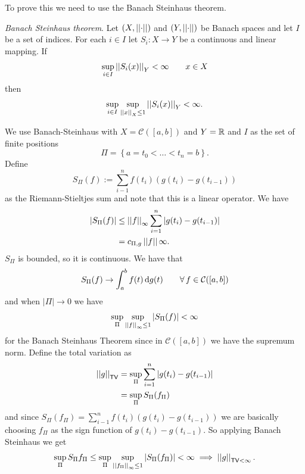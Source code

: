 \documentclass[12pt]{report}
\begin{document}
\begin{fancyproof}
	To prove this we need to use the Banach Steinhaus theorem.
	\begin{theorem}
		\emph{Banach Steinhaus theorem}. Let $\left(X,\left|\left|\cdot\right|\right|\right)$ and $\left(Y,\left|\left|\cdot\right|\right|\right)$ be Banach spaces and let $I$ be a set of indices. For each $i\in I$ let $S_{i}:X\to Y$ be a continuous and linear mapping. If
		\begin{equation*}
			\sup_{i\in I}\left|\left|S_{i}(x)\right|\right|_{Y}<\infty\qquad x\in X
		\end{equation*}
		then
		\begin{equation*}
			\sup_{i\in I}\sup_{\left|\left|x\right|\right|_{X}\leq 1}\left|\left|S_{i}(x)\right|\right|_{Y}<\infty.
		\end{equation*}
	\end{theorem}
	We use Banach-Steinhaus with $X=\mathcal{C}([a,b])$ and $Y=\mathbb{R}$ and $I$ as the set of finite positions
	\begin{equation*}
		\Pi=\left\{a=t_{0}<\ldots<t_{n}=b\right\}.
	\end{equation*}
	Define
	\begin{equation*}
		S_{\Pi}(f):=\sum_{i-1}^{n}f(t_{i})(g(t_{i})-g(t_{i-1}))
	\end{equation*}
	as the Riemann-Stieltjes sum
	and note that this is a linear operator. We have
	\begin{align*}
		\left|S_{\Pi}(f)\right|&\leq\left|\left|f\right|\right|_{\infty}\sum_{i=1}^{n}\left|g(t_{i})-g(t_{i-1})\right|\\
		&=c_{\Pi,g}\left|\left|f\right|\right|\infty.
	\end{align*}
	$S_{\Pi}$ is bounded, so it is continuous. We have that
	\begin{equation*}
		S_{\Pi}(f)\to\int_{a}^{b}f(t)\mathop{}\!\mathrm{d} g(t)\qquad\forall\, f\in\mathcal{C}([a,b])
	\end{equation*}
	and when $|\Pi|\to0$ we have
	\begin{equation*}
		\sup_{\Pi}\sup_{\left|\left|f\right|\right|_{\infty}\leq1}\left|S_{\Pi}(f)\right|<\infty
	\end{equation*}
	for the Banach Steinhaus Theorem since in $\mathcal{C}([a,b])$ we have the supremum norm. Define the total variation as
	\begin{align*}
		\left|\left|g\right|\right|_{\mathsf{TV}}&=\sup_{\Pi}\sum_{i=1}^{n}\left|g(t_{i})-g(t_{i-1})\right|\\
		&=\sup_{\Pi}S_{\Pi}(f_{\Pi})
	\end{align*}
	and since $S_{\Pi}(f_{\Pi})=\sum_{i-1}^{n}f(t_{i})(g(t_{i})-g(t_{i-1}))$ we are basically choosing $f_{\Pi}$ as the sign function of $g(t_{i})-g(t_{i-1
	})$.
	So applying Banach Steinhaus we get
	\begin{equation*}
		\sup_{\Pi}S_{\Pi}f_{\Pi}\leq\sup_{\Pi}\sup_{\left|\left|f_{\Pi}\right|\right|_{\infty}\leq 1}\left|S_{\Pi}(f_{\Pi})\right|<\infty\implies\left|\left|g\right|\right|_{\mathsf{TV}<\infty}.
	\end{equation*}
\end{fancyproof}
\end{document}
